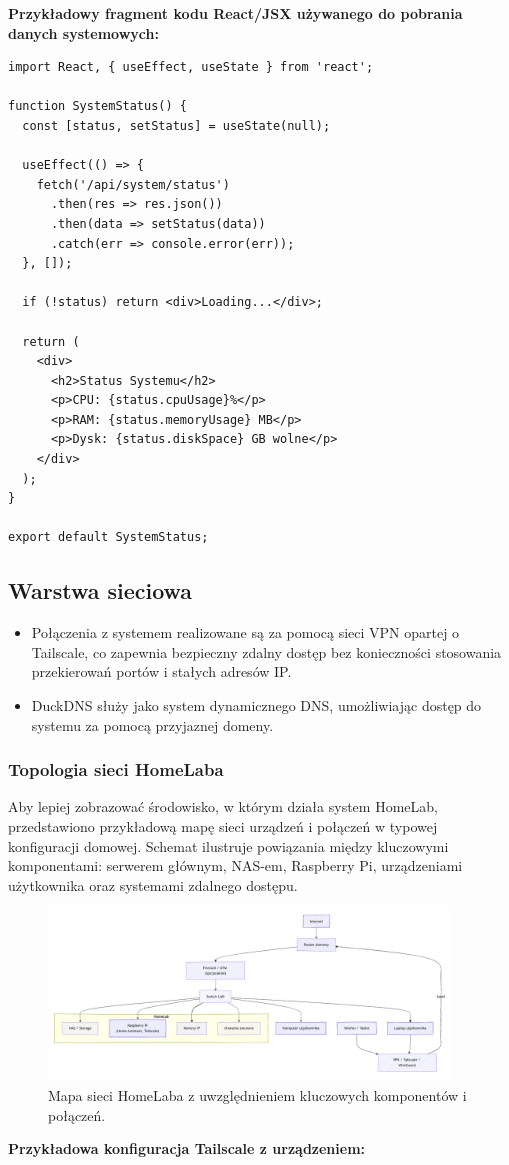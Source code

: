 \textbf{Przykładowy fragment kodu React/JSX używanego do pobrania danych systemowych:}
\begin{verbatim}
import React, { useEffect, useState } from 'react';

function SystemStatus() {
  const [status, setStatus] = useState(null);

  useEffect(() => {
    fetch('/api/system/status')
      .then(res => res.json())
      .then(data => setStatus(data))
      .catch(err => console.error(err));
  }, []);

  if (!status) return <div>Loading...</div>;

  return (
    <div>
      <h2>Status Systemu</h2>
      <p>CPU: {status.cpuUsage}%</p>
      <p>RAM: {status.memoryUsage} MB</p>
      <p>Dysk: {status.diskSpace} GB wolne</p>
    </div>
  );
}

export default SystemStatus;
\end{verbatim}

\subsection{Warstwa sieciowa}
\begin{itemize}
    \item Połączenia z systemem realizowane są za pomocą sieci VPN opartej o Tailscale, co zapewnia bezpieczny zdalny dostęp bez konieczności stosowania przekierowań portów i stałych adresów IP.
    \item DuckDNS służy jako system dynamicznego DNS, umożliwiając dostęp do systemu za pomocą przyjaznej domeny.
\end{itemize}
\subsubsection{Topologia sieci HomeLaba}
Aby lepiej zobrazować środowisko, w którym działa system HomeLab, przedstawiono przykładową mapę sieci urządzeń i połączeń w typowej konfiguracji domowej. Schemat ilustruje powiązania między kluczowymi komponentami: serwerem głównym, NAS-em, Raspberry Pi, urządzeniami użytkownika oraz systemami zdalnego dostępu.

\begin{figure}[H]
\centering
\includegraphics[width=0.95\textwidth]{./chapters/mermeid/schemat sieci homelab.png}
\caption{Mapa sieci HomeLaba z uwzględnieniem kluczowych komponentów i połączeń.}
\label{fig:network_map}
\end{figure}
\textbf{Przykładowa konfiguracja Tailscale z urządzeniem:}

